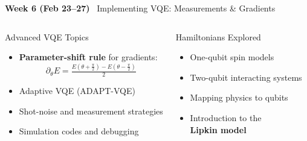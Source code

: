 \documentclass[aspectratio=169,12pt]{beamer}
\newcommand{\week}[1]{\textcolor{qgold}{\textbf{#1}}}
\begin{document}
\begin{frame}{\week{Week 6 (Feb 23--27)} \ Implementing VQE: Measurements \& Gradients}
  \begin{columns}[T]
      \begin{block}{Advanced VQE Topics}
        \begin{itemize}
          \item \textbf{Parameter-shift rule} for gradients:
                \[
                  \partial_\theta E = \tfrac{E(\theta+\frac\pi2)-E(\theta-\frac\pi2)}{2}
                \]
          \item Adaptive VQE (ADAPT-VQE)
          \item Shot-noise and measurement strategies
          \item Simulation codes and debugging
        \end{itemize}
      \end{block}
      \begin{block}{Hamiltonians Explored}
        \begin{itemize}
          \item One-qubit spin models
          \item Two-qubit interacting systems
          \item Mapping physics to qubits
          \item Introduction to the\\
                \textbf{Lipkin model}
        \end{itemize}
      \end{block}
  \end{columns}
\end{frame}
\end{document}
